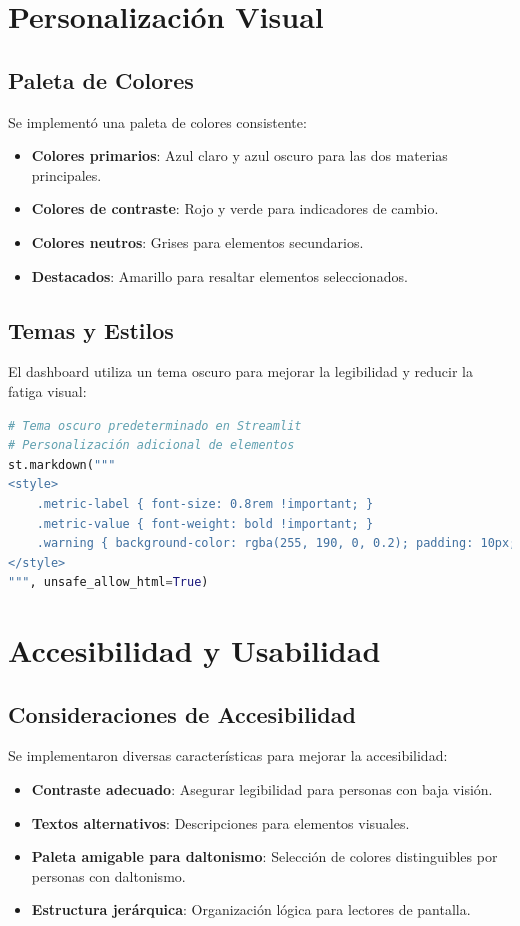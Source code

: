 \section{Personalización Visual}

\subsection{Paleta de Colores}
Se implementó una paleta de colores consistente:

\begin{itemize}
    \item \textbf{Colores primarios}: Azul claro y azul oscuro para las dos materias principales.
    \item \textbf{Colores de contraste}: Rojo y verde para indicadores de cambio.
    \item \textbf{Colores neutros}: Grises para elementos secundarios.
    \item \textbf{Destacados}: Amarillo para resaltar elementos seleccionados.
\end{itemize}

\subsection{Temas y Estilos}
El dashboard utiliza un tema oscuro para mejorar la legibilidad y reducir la fatiga visual:

\begin{lstlisting}[language=Python, caption=Configuración de tema]
# Tema oscuro predeterminado en Streamlit
# Personalización adicional de elementos
st.markdown("""
<style>
    .metric-label { font-size: 0.8rem !important; }
    .metric-value { font-weight: bold !important; }
    .warning { background-color: rgba(255, 190, 0, 0.2); padding: 10px; border-radius: 5px; }
</style>
""", unsafe_allow_html=True)
\end{lstlisting}

\section{Accesibilidad y Usabilidad}

\subsection{Consideraciones de Accesibilidad}
Se implementaron diversas características para mejorar la accesibilidad:

\begin{itemize}
    \item \textbf{Contraste adecuado}: Asegurar legibilidad para personas con baja visión.
    \item \textbf{Textos alternativos}: Descripciones para elementos visuales.
    \item \textbf{Paleta amigable para daltonismo}: Selección de colores distinguibles por personas con daltonismo.
    \item \textbf{Estructura jerárquica}: Organización lógica para lectores de pantalla.
\end{itemize}

